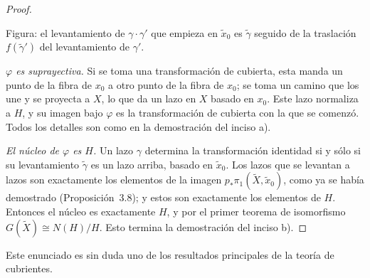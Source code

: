 \documentclass[11pt]{article}
\begin{document}
\begin{proof}
\begin{center}
\end{center}

\noindent Figura: el levantamiento de $\gamma\cdot\gamma'$ que empieza en $\tilde x_0$ es $\tilde\gamma$ seguido de la traslación $f(\tilde\gamma')$ del levantamiento de $\gamma'$.

\emph{$\varphi$ es suprayectiva.} Si se toma una transformación de cubierta, esta manda un punto de la fibra de $x_0$ a otro punto de la fibra de $x_0$; se toma un camino que los une y se proyecta a $X$, lo que da un lazo en $X$ basado en $x_0$. Este lazo normaliza a $H$, y su imagen bajo $\varphi$ es la transformación de cubierta con la que se comenzó. Todos los detalles son como en la demostración del inciso a).

\emph{El núcleo de $\varphi$ es $H$.} Un lazo $\gamma$ determina la transformación identidad si y sólo si su levantamiento $\tilde\gamma$ es un lazo arriba, basado en $\tilde x_0$. Los lazos que se levantan a lazos son exactamente los elementos de la imagen $p_*\pi_1(\tilde X,\tilde x_0)$, como ya se había demostrado (Proposición~3.8); y estos son exactamente los elementos de $H$. Entonces el núcleo es exactamente $H$, y por el primer teorema de isomorfismo $G(\tilde X)\cong N(H)/H$. Esto termina la demostración del inciso b).
\end{proof}

Este enunciado es sin duda uno de los resultados principales de la teoría de cubrientes.

\begin{erratas}
\end{erratas}
\end{document}
